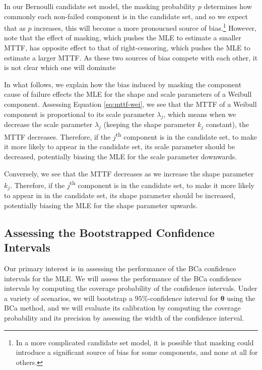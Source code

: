 \documentclass[
]{article}
\begin{document}
In our Bernoulli candidate set model, the masking probability \(p\)
determines how commonly each non-failed component is in the candidate
set, and so we expect that as \(p\) increases, this will become a more
pronoucned source of
bias.\footnote{In a more complicated candidate set model, it is possible
that masking could introduce a significant source of bias for some components, and none at all
for others.} However, note that the effect of masking, which pushes the
MLE to estimate a smaller MTTF, has opposite effect to that of
right-censoring, which pushes the MLE to estimate a larger MTTF. As
these two sources of bias compete with each other, it is not clear which
one will dominate

In what follows, we explain how the bias induced by masking the
component cause of failure effects the MLE for the shape and scale
parameters of a Weibull component. Assessing Equation
\eqref{eq:mttf-wei}, we see that the MTTF of a Weibull component is
proportional to its scale parameter \(\lambda_j\), which means when we
decrease the scale parameter \(\lambda_j\) (keeping the shape parameter
\(k_j\) constant), the MTTF decreases. Therefore, if the
\(j\)\textsuperscript{th} component is in the candidate set, to make it
more likely to appear in the candidate set, its scale parameter should
be decreased, potentially biasing the MLE for the scale parameter
downwards.

Conversely, we see that the MTTF decreases as we increase the shape
parameter \(k_j\). Therefore, if the \(j\)\textsuperscript{th} component
is in the candidate set, to make it more likely to appear in in the
candidate set, its shape parameter should be increased, potentially
biasing the MLE for the shape parameter upwards.

\hypertarget{assessing-the-bootstrapped-confidence-intervals}{%
\subsection{Assessing the Bootstrapped Confidence
Intervals}\label{assessing-the-bootstrapped-confidence-intervals}}

Our primary interest is in assessing the performance of the BCa
confidence intervals for the MLE. We will assess the performance of the
BCa confidence intervals by computing the coverage probability of the
confidence intervals. Under a variety of scenarios, we will bootstrap a
\(95\%\)-confidence interval for \(\boldsymbol{\theta}\) using the BCa
method, and we will evaluate its calibration by computing the coverage
probability and its precision by assessing the width of the confidence
interval.
\end{document}
